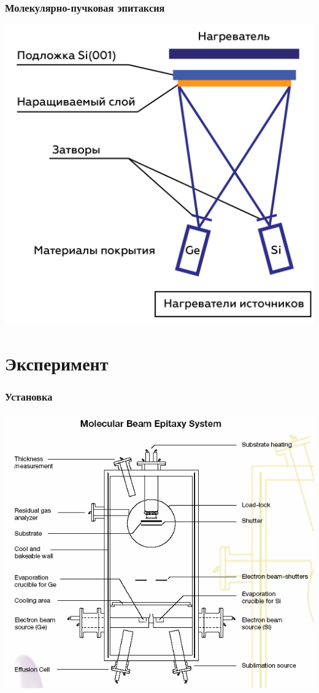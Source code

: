 \documentclass[10pt,pdf,hyperref={unicode}, dvipsnames]{beamer}
\begin{document}
\begin{frame}[t]
	\frametitle{Молекулярно-пучковая эпитаксия}
	\centering
	\includegraphics[width = .75\linewidth]{imgs/MBE.png}
\end{frame}


\section{Эксперимент}
\begin{frame}[t]
	\frametitle{Установка}
	\centering
	\includegraphics[width = .8\linewidth]{imgs/exp.jpg}
\end{frame}
\end{document}
